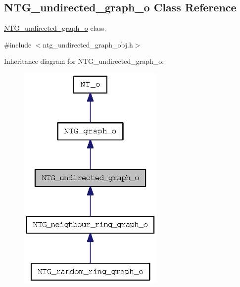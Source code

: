 \subsection{NTG\_\-undirected\_\-graph\_\-o Class Reference}
\label{class_n_t_g__undirected__graph__o}


\hyperlink{class_n_t_g__undirected__graph__o}{NTG\_\-undirected\_\-graph\_\-o} class.  




{\ttfamily \#include $<$ntg\_\-undirected\_\-graph\_\-obj.h$>$}



Inheritance diagram for NTG\_\-undirected\_\-graph\_\-o:
\nopagebreak
\begin{figure}[H]
\begin{center}
\leavevmode
\includegraphics[width=202pt]{class_n_t_g__undirected__graph__o__inherit__graph}
\end{center}
\end{figure}


